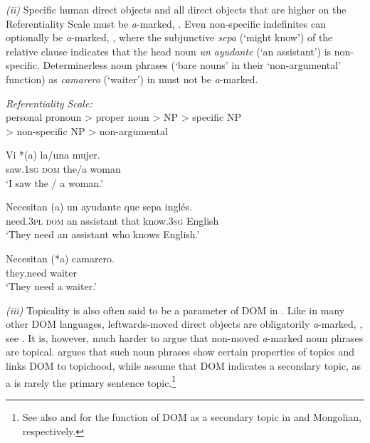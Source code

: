 \documentclass[output=paper]{LSP/langsci}
\begin{document}
\textit{(ii)} Specific  human direct objects and all direct objects that are higher on the Referentiality Scale  must be \textit{a}-marked, \cf {}. Even non-specific indefinites can optionally be \textit{a}-marked, \cf {}, where the subjunctive \textit{sepa} (`might know') of the relative clause indicates that the head noun \textit{un ayudante} (‘an assistant’) is non-specific. Determinerless noun phrases (‘bare nouns’ in their ‘non-argumental’ function) as \textit{camarero} (‘waiter’) in  must not be \textit{a}-marked.

\ea
\label{11-he-ex:15}
 \textit{Referentiality Scale:}\\ 

 personal pronoun > proper noun >  NP > specific  NP\\ 

 > non-specific  NP > non-argumental
\z

\ea
\label{11-he-ex:16}

\gll Vi *(a) la/una mujer.\\
saw.\textsc{1sg} \textsc{dom} the/a woman\\
\glt ‘I saw the / a woman.’
\z

\ea
\label{11-he-ex:17}

\gll Necesitan (a) un ayudante que sepa inglés.\\
need.\textsc{3pl} \textsc{dom} an assistant that know.\textsc{3sg} English\\
\glt ‘They need an assistant who knows English.’
\z

\ea
\label{11-he-ex:18}

\gll Necesitan (*a) camarero.\\
they.need {} waiter\\
\glt ‘They need a waiter.’
\z

\textit{(iii)} Topicality is also often said to be a parameter of DOM in . Like in many other DOM languages, leftwards-moved direct objects are obligatorily \textit{a}-marked, \cf {}, see \citet[86]{Leonetti2004Specificity}. It is, however, much harder to argue that non-moved \textit{a}-marked noun phrases are topical. \citet{Iemmolo2010Topicality} argues that such noun phrases show certain properties of topics and links DOM to topichood, while  \citet{Dalrympleetal2011Objects} assume that DOM indicates a secondary topic, as a  is rarely the primary sentence topic.\footnote{See also \citet{Chiriacescu2014Discourse} and \citet{Guntsetseg2016} for the function of DOM as a secondary topic in  and Mongolian, respectively.}
\end{document}
